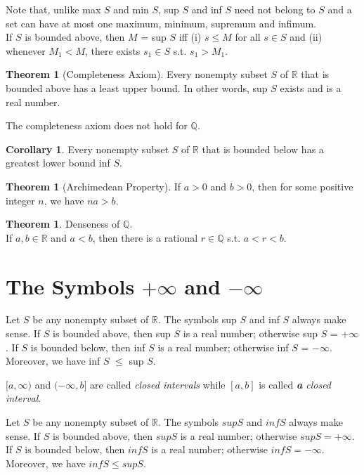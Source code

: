 \documentclass{book}
\theoremstyle{definition}
\newtheorem{theorem}[definition]{Theorem}
\newtheorem{corollary}[definition]{Corollary}
\begin{document}
Note that, unlike max $S$ and min $S$, sup $S$ and inf $S$ need not belong to $S$ and a set can have at most one maximum, minimum, supremum and infimum.
\\ If $S$ is bounded above, then $M$ = sup $S$ iff (i) $s \leq M$ for all $s \in S$ and (ii) whenever $M_1 < M$, there exists $s_1 \in S$ s.t. $s_1 > M_1$.
\begin{theorem}[Completeness Axiom]
Every nonempty subset $S$ of $\mathbb{R}$ that is bounded above has a least upper bound. In other words, sup $S$ exists and is a real number.
\end{theorem}
The completeness axiom does not hold for $\mathbb{Q}$.
\begin{corollary}
Every nonempty subset $S$ of $\mathbb{R}$ that is bounded below has a greatest lower bound inf $S$.
\end{corollary}
\begin{theorem}[Archimedean Property]
If $a > 0$ and $b > 0$, then for some positive integer $n$, we have $na > b$.
\end{theorem}
\begin{theorem}
Denseness of $\mathbb{Q}$.
\\ If $a,b \in \mathbb{R}$ and $a < b$, then there is a rational $r \in \mathbb{Q}$ s.t. $a < r < b$.
\end{theorem}
\section{The Symbols $+\infty$ and $-\infty$}
Let $S$ be any nonempty subset of $\mathbb{R}$. The symbols sup $S$ and inf $S$ always make sense. If $S$ is bounded above, then sup $S$ is a real number; otherwise sup $S$ = $+\infty$. If $S$ is bounded below, then inf $S$ is a real number; otherwise inf $S$ = $-\infty$. Moreover, we have inf $S$ $\leq$ sup $S$.

$[a, \infty)$ and $(-\infty, b]$ are called \textit{closed intervals} while $[a, b]$ is called \textit{\textbf{a} closed interval}.

Let $S$ be any nonempty subset of $\mathbb{R}$. The symbols $sup S$ and $inf S$ always make sense. If $S$ is bounded above, then $sup S$ is a real number; otherwise $supS=+\infty$. If $S$ is bounded below, then $inf S$ is a real number; otherwise $inf S= -\infty$. Moreover, we have $inf S \leq sup S$.
\end{document}
